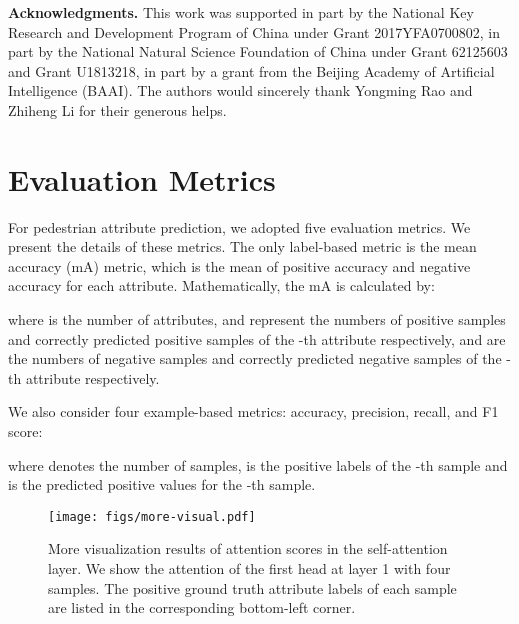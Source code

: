 \documentclass[runningheads]{llncs}
\begin{document}
\noindent \textbf{Acknowledgments.} 
This work was supported in part by the National Key Research and Development Program of China under Grant 2017YFA0700802, in part by the National Natural Science Foundation of China under Grant 62125603 and Grant U1813218, in part by a grant from the Beijing Academy of Artificial Intelligence (BAAI).  The authors would sincerely thank Yongming Rao and Zhiheng Li for their generous helps.





\newpage
\appendix
\begin{center}
\end{center}


\section{Evaluation Metrics}
For pedestrian attribute prediction, we adopted five evaluation metrics. We present the details of these metrics. The only label-based metric is the mean accuracy (mA) metric, which is the mean of positive accuracy and negative accuracy for each attribute. Mathematically, the mA is calculated by:

where  is the number of attributes,  and  represent the numbers of positive samples and correctly predicted positive samples of the -th attribute respectively,  and  are the numbers of negative samples and correctly predicted negative samples of the -th attribute respectively.

We also consider four example-based metrics: accuracy, precision, recall, and F1 score:

where  denotes the number of samples,  is the  positive labels of the -th sample and  is the predicted positive values for the -th sample.



\begin{figure}[t]
\begin{center}
   \texttt{[image: figs/more-visual.pdf]}
\end{center}
\caption{More visualization results of attention scores in the self-attention layer. We show the attention of the first head at layer 1 with four samples. The positive ground truth attribute labels of each sample are listed in the corresponding bottom-left corner.
}
\label{fig:morevisual}
\end{figure}
\end{document}
